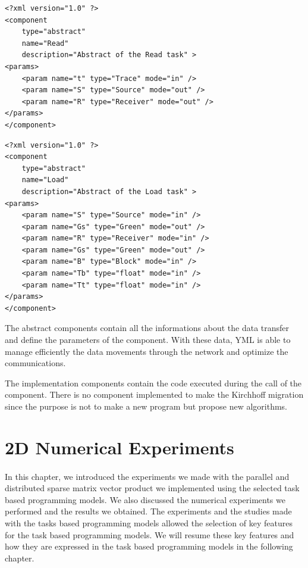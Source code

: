 \begin{lstlisting}[tabsize=5, frame=single, basicstyle=\small\ttfamily, title=Abstract of Read task]
<?xml version="1.0" ?>
<component
	type="abstract"
	name="Read"
	description="Abstract of the Read task" >
<params>
	<param name="t" type="Trace" mode="in" />
	<param name="S" type="Source" mode="out" />
	<param name="R" type="Receiver" mode="out" />
</params>
</component>
\end{lstlisting}

\begin{lstlisting}[tabsize=5, frame=single, basicstyle=\small\ttfamily, title=Abstract of Load task]
<?xml version="1.0" ?>
<component
	type="abstract"
	name="Load"
	description="Abstract of the Load task" >
<params>
	<param name="S" type="Source" mode="in" />
	<param name="Gs" type="Green" mode="out" />
	<param name="R" type="Receiver" mode="in" />
	<param name="Gs" type="Green" mode="out" />
	<param name="B" type="Block" mode="in" />
	<param name="Tb" type="float" mode="in" />
	<param name="Tt" type="float" mode="in" />
</params>
</component>
\end{lstlisting}

The abstract components contain all the informations about the data transfer and define the parameters of the component.
With these data, YML is able to manage efficiently the data movements through the network and optimize the communications.

The implementation components contain the code executed during the call of the component.
There is no component implemented to make the Kirchhoff migration since the purpose is not to make a new program but propose new algorithms.


\section{2D Numerical Experiments}

\paragraph{}
In this chapter, we introduced the experiments we made with the parallel and distributed sparse matrix vector product we implemented using the selected task based programming models.
We also discussed the numerical experiments we performed and the results we obtained.
The experiments and the studies made with the tasks based programming models allowed the selection of key features for the task based programming models.
We will resume these key features and how they are expressed in the task based programming models in the following chapter.